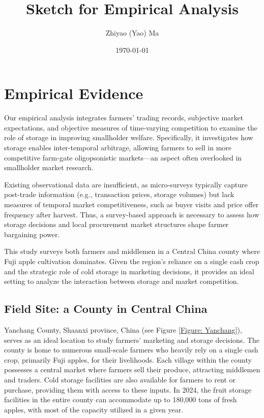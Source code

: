 \documentclass[12pt]{article}
\title{Sketch for Empirical Analysis}
\author{Zhiyao (Yao) Ma}
\date{\today}
\begin{document}
\maketitle

\section{Empirical Evidence}

\noindent Our empirical analysis integrates farmers' trading records, subjective market expectations, and objective measures of time-varying competition to examine the role of storage in improving smallholder welfare. Specifically, it investigates how storage enables inter-temporal arbitrage, allowing farmers to sell in more competitive farm-gate oligopsonistic markets—an aspect often overlooked in smallholder market research.

Existing observational data are insufficient, as micro-surveys typically capture post-trade information (e.g., transaction prices, storage volumes) but lack measures of temporal market competitiveness, such as buyer visits and price offer frequency after harvest. Thus, a survey-based approach is necessary to assess how storage decisions and local procurement market structures shape farmer bargaining power.

This study surveys both farmers and middlemen in a Central China county where Fuji apple cultivation dominates. Given the region's reliance on a single cash crop and the strategic role of cold storage in marketing decisions, it provides an ideal setting to analyze the interaction between storage and market competition.


\subsection{Field Site: a County in Central China}
\noindent Yanchang County, Shaanxi province, China (see Figure \ref{Figure: Yanchang}), serves as an ideal location to study farmers' marketing and storage decisions. The county is home to numerous small-scale farmers who heavily rely on a single cash crop, primarily Fuji apples, for their livelihoods. Each village within the county possesses a central market where farmers sell their produce, attracting middlemen and traders. Cold storage facilities are also available for farmers to rent or purchase, providing them with access to these inputs. In 2024, the fruit storage facilities in the entire county can accommodate up to 180,000 tons of fresh apples, with most of the capacity utilized in a given year.
\end{document}
